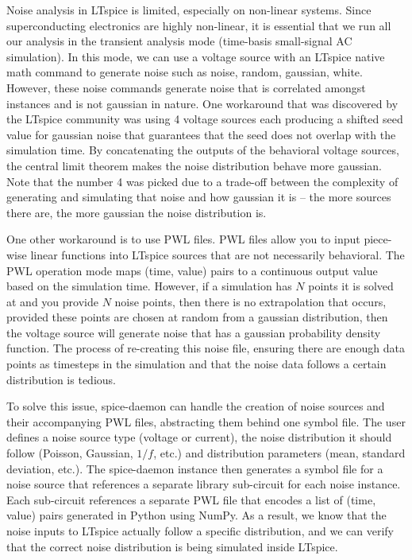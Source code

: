 \documentclass{article}
\newcommand{\cf}[1]{\textsf{#1}}
\begin{document}
Noise analysis in LTspice is limited, especially on non-linear systems. Since superconducting electronics
are highly non-linear, it is essential that we run all our analysis in the transient analysis mode (time-basis 
small-signal AC simulation). In this mode, we can use a voltage source with an LTspice native math command
to generate noise such as \cf{noise}, \cf{random}, \cf{gaussian}, \cf{white}. However, these noise commands
generate noise that is correlated amongst instances and is not gaussian in nature. One workaround that was
discovered by the LTspice community was using 4 voltage sources each producing a shifted seed value for 
gaussian noise that guarantees that the seed does not overlap with the simulation time. By concatenating the
outputs of the behavioral voltage sources, the central limit theorem makes the noise distribution behave more 
gaussian. Note that the number 4 was picked due to a trade-off between the complexity of generating and simulating
that noise and how gaussian it is -- the more sources there are, the more gaussian the noise distribution is.

One other workaround is to use PWL files. PWL files allow you to input piece-wise linear functions into LTspice
sources that are not necessarily behavioral. The PWL operation mode maps (time, value) pairs to a continuous 
output value based on the simulation time. However, if a simulation has $N$ points it is solved at and you 
provide $N$ noise points, then there is no extrapolation that occurs, provided these points are chosen at random 
from a gaussian distribution, then the voltage source will generate noise that has a gaussian probability density
function. The process of re-creating this noise file, ensuring there are enough data points as timesteps in the 
simulation and that the noise data follows a certain distribution is tedious.

To solve this issue, spice-daemon can handle the creation of noise sources and their accompanying PWL files,
abstracting them behind one symbol file. The user defines a noise source type (voltage or current), the 
noise distribution it should follow (Poisson, Gaussian, $1/f$, etc.) and distribution parameters (mean, 
standard deviation, etc.). The spice-daemon instance then generates a symbol file for a noise source that 
references a separate library sub-circuit for each noise instance. Each sub-circuit references a 
separate PWL file that encodes a list of (time, value) pairs generated in Python using
\cf{NumPy}. As a result, we know that the noise inputs to LTspice actually follow a specific distribution, and we
can verify that the correct noise distribution is being simulated inside LTspice.
\end{document}

